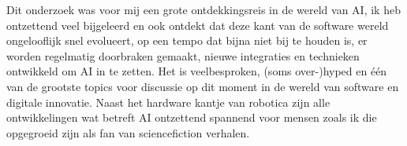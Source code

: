 Dit onderzoek was voor mij een grote ontdekkingsreis in de wereld van AI, ik heb ontzettend veel bijgeleerd en ook ontdekt dat deze kant van de software wereld ongelooflijk snel evolueert, op een tempo dat bijna niet bij te houden is, er worden regelmatig doorbraken gemaakt, nieuwe integraties en technieken ontwikkeld om AI in te zetten. Het is veelbesproken, (soms over-)hyped en één van de grootste topics voor discussie op dit moment in de wereld van software en digitale innovatie. Naast het hardware kantje van robotica zijn alle ontwikkelingen wat betreft AI ontzettend spannend voor mensen zoals ik die opgegroeid zijn als fan van sciencefiction verhalen. \\

